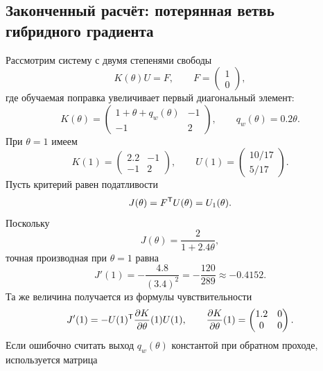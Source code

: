 \subsection{Законченный расчёт: потерянная ветвь гибридного градиента}
\label{subsec:worked-hybrid-gradient}
Рассмотрим систему с двумя степенями свободы
\begin{equation}
 K(\theta)U=F,
 \qquad
 F=\begin{pmatrix}1\\0\end{pmatrix},
\end{equation}
где обучаемая поправка увеличивает первый диагональный элемент:
\begin{equation}
 K(\theta)
 =
 \begin{pmatrix}
  1+\theta+q_w(\theta) & -1\\
  -1 & 2
 \end{pmatrix},
 \qquad
 q_w(\theta)=0.2\theta.
\end{equation}
При $\theta=1$ имеем
\begin{equation}
 K(1)
 =
 \begin{pmatrix}
  2.2 & -1\\
  -1 & 2
 \end{pmatrix},
 \qquad
 U(1)
 =
 \begin{pmatrix}
  10/17\\5/17
 \end{pmatrix}.
\end{equation}
Пусть критерий равен податливости
\begin{equation}
 J(\theta)=F^{\mathsf{T}}U(\theta)=U_1(\theta).
\end{equation}
Поскольку
\begin{equation}
 J(\theta)
 =
 \frac{2}{1+2.4\theta},
\end{equation}
точная производная при $\theta=1$ равна
\begin{equation}
 J'(1)
 =
 -\frac{4.8}{(3.4)^2}
 =
 -\frac{120}{289}
 \approx
 -0.4152.
\end{equation}
Та же величина получается из формулы чувствительности
\begin{equation}
 J'(1)
 =
 -U(1)^{\mathsf{T}}
 \frac{\partial K}{\partial\theta}(1)
 U(1),
 \qquad
 \frac{\partial K}{\partial\theta}(1)
 =
 \begin{pmatrix}
  1.2 & 0\\0 & 0
 \end{pmatrix}.
\end{equation}
Если ошибочно считать выход $q_w(\theta)$ константой при обратном проходе, используется матрица

